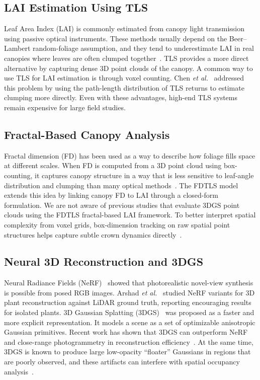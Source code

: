 \documentclass[10pt,twocolumn,letterpaper]{article}
\begin{document}
\subsection{LAI Estimation Using TLS}

Leaf Area Index (LAI) is commonly estimated from canopy light transmission using passive optical instruments. These methods usually depend on the Beer--Lambert random-foliage assumption, and they tend to underestimate LAI in real canopies where leaves are often clumped together~\cite{yan2019review}. TLS provides a more direct alternative by capturing dense 3D point clouds of the canopy. A common way to use TLS for LAI estimation is through voxel counting. Chen \textit{et al.}~\cite{chen2018estimation} addressed this problem by using the path-length distribution of TLS returns to estimate clumping more directly. Even with these advantages, high-end TLS systems remain expensive for large field studies.

\subsection{Fractal-Based Canopy Analysis}

Fractal dimension (FD) has been used as a way to describe how foliage fills space at different scales. When FD is computed from a 3D point cloud using box-counting, it captures canopy structure in a way that is less sensitive to leaf-angle distribution and clumping than many optical methods~\cite{van2015box}. The FDTLS model~\cite{lai2026estimating} extends this idea by linking canopy FD to LAI through a closed-form formulation. We are not aware of previous studies that evaluate 3DGS point clouds using the FDTLS fractal-based LAI framework. To better interpret spatial complexity from voxel grids, box-dimension tracking on raw spatial point structures helps capture subtle crown dynamics directly~\cite{arseniou2021measuring}.

\subsection{Neural 3D Reconstruction and 3DGS}

Neural Radiance Fields (NeRF)~\cite{mildenhall2021nerf} showed that photorealistic novel-view synthesis is possible from posed RGB images. Arshad \textit{et al.}~\cite{arshad2024evaluating} studied NeRF variants for 3D plant reconstruction against LiDAR ground truth, reporting encouraging results for isolated plants. 3D Gaussian Splatting (3DGS)~\cite{kerbl20233d} was proposed as a faster and more explicit representation. It models a scene as a set of optimizable anisotropic Gaussian primitives. Recent work has shown that 3DGS can outperform NeRF and close-range photogrammetry in reconstruction efficiency~\cite{tian2025comparative}. At the same time, 3DGS is known to produce large low-opacity ``floater'' Gaussians in regions that are poorly observed, and these artifacts can interfere with spatial occupancy analysis~\cite{shang2025enhanced}.
\end{document}

